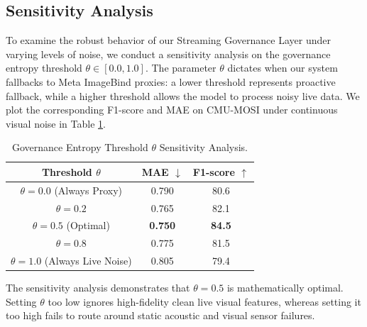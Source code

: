\documentclass[sn-mathphys,Numbered]{sn-jnl}
\theoremstyle{thmstyleone}
\theoremstyle{thmstyletwo}
\theoremstyle{thmstylethree}
\begin{document}
\subsection{Sensitivity Analysis}\label{subsec:sensitivity}
To examine the robust behavior of our Streaming Governance Layer under varying levels of noise, we conduct a sensitivity analysis on the governance entropy threshold $\theta \in [0.0, 1.0]$. The parameter $\theta$ dictates when our system fallbacks to Meta ImageBind proxies: a lower threshold represents proactive fallback, while a higher threshold allows the model to process noisy live data. We plot the corresponding F1-score and MAE on CMU-MOSI under continuous visual noise in Table \ref{tab:sensitivity}.
\begin{table}[htbp]
\centering
\caption{Governance Entropy Threshold $\theta$ Sensitivity Analysis.}
\label{tab:sensitivity}
\begin{tabular}{ccc}
\toprule
\textbf{Threshold $\theta$} & \textbf{MAE $\downarrow$} & \textbf{F1-score $\uparrow$} \\
\midrule
$\theta = 0.0$ (Always Proxy) & 0.790 & 80.6 \\
\midrule
$\theta = 0.2$ & 0.765 & 82.1 \\
\midrule
$\theta = 0.5$ (Optimal) & \textbf{0.750} & \textbf{84.5} \\
\midrule
$\theta = 0.8$ & 0.775 & 81.5 \\
\midrule
$\theta = 1.0$ (Always Live Noise) & 0.805 & 79.4 \\
\bottomrule
\end{tabular}
\end{table}
The sensitivity analysis demonstrates that $\theta=0.5$ is mathematically optimal. Setting $\theta$ too low ignores high-fidelity clean live visual features, whereas setting it too high fails to route around static acoustic and visual sensor failures.
\end{document}
